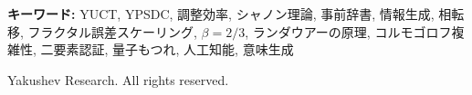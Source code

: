 \documentclass[12pt,a4paper]{article}
\theoremstyle{definition}
\theoremstyle{remark}
\begin{document}
\begin{titlepage}
\begin{center}
			\begin{minipage}{0.9\textwidth}
				\begin{abstract}
					\noindent
					本付録は、YPSDCプロトコルの一般化情報理論をヤクシェフ統一調整理論（YUCT）の他の部分と完全に一致させる。普遍誤差則は\textbf{定常的な冪乗則の形}
					\[
					\varepsilon = \kappa_c \, \alpha \, K_{\mathrm{eff}}^{-\beta},
					\qquad \beta = \frac{2}{3},\quad \kappa_c = \frac{1}{3},
					\]
					をとり、付録Yの微視的導出、付録Lの経験的検証、そして主要な代数的ループ \(S_{\mathrm{odd}}+S_{\mathrm{even}}=2\) の閉包と一致する。この単一の法則から、一般化されたベル不等式
					\[
					S(K_{\mathrm{eff}}) = 2 + \bigl(2\sqrt{2}-2\bigr)\,
					\bigl(1 - 2\kappa_c\alpha K_{\mathrm{eff}}^{-\beta}\bigr),
					\]
					を導出する。これは \(K_{\mathrm{eff}}=1\) で古典的局所実在論の限界 \(S=2\) を、\(K_{\mathrm{eff}}\to\infty\) でツィレルソン限界 \(S=2\sqrt{2}\) を再現する。以前の対数型 \(\varepsilon\propto(\ln K_{\mathrm{eff}})^{2/3}\) は物理的に動機づけられておらず、YUCTの核心構造と矛盾するとして明示的に破棄される。\(\varepsilon(K_{\mathrm{eff}})\) の関数形に依存するすべての節——有用調整容量、最適辞書サイズ、熱力学効率、コルモゴロフ複雑性限界、意味生成への相転移——は、それに応じて更新された。したがって、付録Xの本バージョンは、調整効率、チャネル容量、量子相関、辞書の熱力学に関する統一されたパラメータフリーな記述を提供する。
				\end{abstract}
			\end{minipage}
			
			\vspace{1cm}
			
			\noindent
			\small\textbf{キーワード:} YUCT, YPSDC, 調整効率, シャノン理論, 事前辞書, 情報生成, 相転移, フラクタル誤差スケーリング, $\beta=2/3$, ランダウアーの原理, コルモゴロフ複雑性, 二要素認証, 量子もつれ, 人工知能, 意味生成
			
			\vspace{0.5cm}
			
			\noindent
			 Yakushev Research. All rights reserved.
		\end{center}
	\end{titlepage}
	
	\tableofcontents
	\newpage
	
\end{document}

